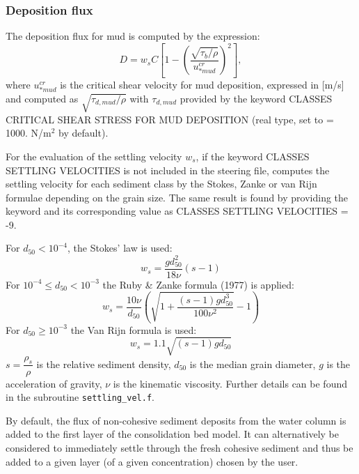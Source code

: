 \subsubsection{Deposition flux}
The deposition flux for mud is computed by the expression:
\begin{equation}
D = w_{s} C \left[1-\left(\frac{\sqrt{\tau_b/\rho}}{u_{*mud}^{cr}}\right)^2 \right],
\end{equation}
where $u_{*mud}^{cr}$ is the critical shear velocity for mud deposition, expressed in [m/s] and computed as $\sqrt{\tau_{d,mud}/\rho}$ with $\tau_{d,mud}$ provided by the keyword {\ttfamily CLASSES CRITICAL SHEAR STRESS FOR MUD DEPOSITION} (real type, set to {\ttfamily = 1000.} N/m$^2$ by default).

For the evaluation of the settling velocity $w_s $, if the keyword {\ttfamily CLASSES SETTLING VELOCITIES} is not included in the steering file, \gaia{} computes the settling velocity for each sediment class by the Stokes, Zanke or van Rijn formulae depending on the grain size.
The same result is found by providing the keyword and its corresponding value as {\ttfamily CLASSES SETTLING VELOCITIES = -9}.

For $d_{50}<10^{-4}$, the Stokes' law is used:
\begin{equation}
w_s=\frac{gd_{50}^2}{18 \nu}(s-1)
\label{eq:stokes:settling:vel}
\end{equation}
For $10^{-4}\le d_{50}<10^{-3}$ the Ruby \& Zanke formula (1977) is applied:
\begin{equation}
w_s=\frac{10 \nu}{d_{50}}\left(\sqrt{1+\dfrac{(s-1)gd_{50}^3}{100 \nu^2}}-1 \right)
\label{eq:zanke:settling:vel}
\end{equation}
For $d_{50}\ge10^{-3}$ the Van Rijn formula is used:
\begin{equation}
w_s=1.1\sqrt{(s-1)gd_{50}}
\label{eq:vanR:settling:vel}
\end{equation}
$s=\dfrac{\rho_s}{\rho}$ is the relative sediment density, $d_{50}$ is the median grain diameter, $g$ is the acceleration of gravity, $\nu$ is the kinematic viscosity.
Further details can be found in the subroutine \texttt{settling\_vel.f}.

By default, the flux of non-cohesive sediment deposits from the water column is added to the first layer of the consolidation bed model. It can alternatively be considered to immediately settle through the fresh cohesive sediment and thus be added to a given layer (of a given concentration) chosen by the user.

